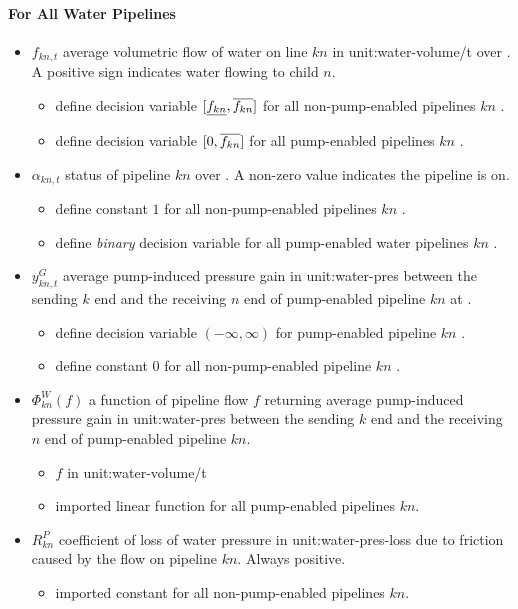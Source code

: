 \paragraph{For All Water Pipelines}
\begin{itemize}

\item $f_{kn,t}$ average volumetric flow of water on line $kn$ in
  \gls{unit:water-volume/t} over \intervaloft{}. A positive sign indicates water
  flowing to child $n$.
  \begin{itemize}
  \item \gls{define} decision variable $[\underline{f_{kn}}, \overline{f_{kn}}]$ for all
    non-pump-enabled pipelines $kn$ \atallt{}.
  \item \gls{define} decision variable $[0, \overline{f_{kn}}]$ for all pump-enabled
    pipelines $kn$ \atallt{}.
  \end{itemize}

\item $\alpha_{kn,t}$ status of pipeline $kn$ over \intervaloft{}.
  A non-zero value  indicates the pipeline is on.
  \begin{itemize}
  \item \gls{define} constant $1$ for all non-pump-enabled pipelines $kn$
    \atallt{}.
  \item \gls{define} \emph{binary} decision variable for all pump-enabled water
    pipelines $kn$ \atallt{}.
  \end{itemize}

\item $y^G_{kn,t}$ average pump-induced pressure gain in \gls{unit:water-pres}
  between the sending $k$ end and the receiving $n$ end of pump-enabled pipeline
  $kn$ at \intervaloft{}.
  \begin{itemize}
  \item \gls{define} decision variable $(-\infty, \infty)$ for pump-enabled
    pipeline $kn$ \atallt{}.
  \item \gls{define} constant $0$ for all non-pump-enabled pipeline $kn$
    \atallt{}.
  \end{itemize}

\item $\Phi^{W}_{kn}(f)$ a function of pipeline flow $f$ returning average
  pump-induced pressure gain in \gls{unit:water-pres} between the sending $k$
  end and the receiving $n$ end of pump-enabled pipeline $kn$.

  \begin{itemize}
  \item $f$ in \gls{unit:water-volume/t}
  \item \gls{imported} linear function for all pump-enabled pipelines $kn$.
  \end{itemize}

\item $R^P_{kn}$ coefficient of loss of water pressure in
  \gls{unit:water-pres-loss} due to friction caused by the flow on pipeline
  $kn$. Always positive.

  \begin{itemize}
  \item \gls{imported} constant for all non-pump-enabled pipelines $kn$.
  \end{itemize}

\end{itemize}
